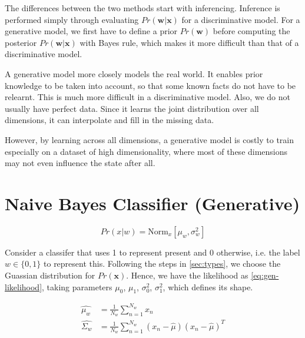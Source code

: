 \documentclass[11pt,openright,a4paper]{article}
\numberwithin{equation}{section}
\begin{document}
The differences between the two methods start with inferencing. Inference is performed simply through evaluating $Pr(\mathbf{w}|\mathbf{x})$ for a discriminative model. For a generative model, we first have to define a prior $Pr(\mathbf{w})$ before computing the posterior $Pr(\mathbf{w}|\mathbf{x})$ with Bayes rule, which makes it more difficult than that of a discriminative model.

A generative model more closely models the real world. It enables prior knowledge to be taken into account, so that some known facts do not have to be relearnt. This is much more difficult in a discriminative model. Also, we do not usually have perfect data. Since it learns the joint distribution over all dimensions, it can interpolate and fill in the missing data.

However, by learning across all dimensions, a generative model is costly to train especially on a dataset of high dimensionality, where most of these dimensions may not even influence the state after all. 


\section{Naive Bayes Classifier (Generative)} \label{sec:gen}



\begin{equation} \label{eq:gen-likelihood}
    Pr \left ( x | w \right ) = \text{Norm}_x \left [ \mu_w, \sigma_{w}^{2}  \right ]
\end{equation}

Consider a classifer that uses 1 to represent present and 0 otherwise, i.e. the label $w \in \{0,1\}$ to represent this. Following the steps in \autoref{sec:types}, we choose the Guassian distribution for $Pr(\mathbf{x})$. Hence, we have the likelihood as \autoref{eq:gen-likelihood}, taking parameters $\mu_0$, $\mu_1$, $\sigma_{0}^{2}$, $\sigma_{1}^{2}$, which defines its shape.

\begin{equation} \label{eq:gen-params}
    \begin{aligned}
        \hat{\mu_{w}} &= \frac{1}{N_{w}} \sum_{n=1}^{N_w} x_n
        \\
        \hat{\Sigma_w} &= \frac{1}{N_w} \sum_{n=1}^{N_w} \left ( x_n - \hat{\mu}  \right ) \left ( x_n - \hat{\mu} \right )^{T}
    \end{aligned}
\end{equation}
\end{document}
